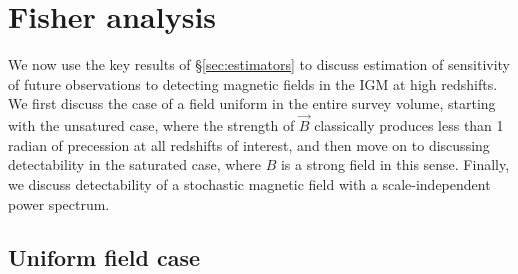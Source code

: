 \section{Fisher analysis}
\label{sec:fisher}

We now use the key results of \S\ref{sec:estimators} to discuss estimation of sensitivity of future observations to detecting magnetic fields in the IGM at high redshifts. We first discuss the case of a field uniform in the entire survey volume, starting with the unsatured case, where the strength of $\vec B$ classically produces less than 1 radian of precession at all redshifts of interest, and then move on to discussing detectability in the saturated case, where $B$ is a strong field in this sense. Finally, we discuss detectability of a stochastic magnetic field with a scale-independent power spectrum.

\subsection{Uniform field case}
\label{subsec:uniform_fisher}

